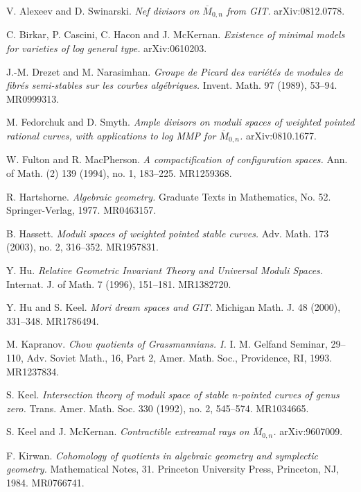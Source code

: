 \documentclass[10pt]{amsart}
\theoremstyle{definition}
\def\Mzn{\overline{M}_{0,n} }
\begin{document}


\begin{thebibliography}{10}

 V. Alexeev and D. Swinarski. {\em Nef divisors on
$\overline{M}_{0,n}$ from GIT.} arXiv:0812.0778.

 C. Birkar, P. Cascini, C. Hacon and J. McKernan.
{\em Existence of minimal models for varieties of log general type.}
arXiv:0610203.

J.-M. Drezet and M. Narasimhan. {\em Groupe de Picard des
vari\'et\'es de modules de fibr\'es semi-stables sur les courbes
alg\'ebriques.} Invent. Math. 97 (1989), 53--94. MR0999313.

 M. Fedorchuk and D. Smyth. {\em Ample divisors
on moduli spaces of weighted pointed rational curves, with
applications to log MMP for $\overline{M}_{0,n}$.}
arXiv:0810.1677.

 W. Fulton and R. MacPherson. {\em A compactification
of configuration spaces.} Ann. of Math. (2)  139  (1994),  no. 1, 183--225.
MR1259368.

 R. Hartshorne. {\em Algebraic geometry.}
Graduate Texts in Mathematics, No. 52. Springer-Verlag, 1977. MR0463157.

 B. Hassett. {\em Moduli spaces of weighted pointed stable curves.}
Adv. Math.  173  (2003),  no. 2, 316--352. MR1957831.

 Y. Hu. {\em Relative Geometric Invariant Theory and Universal Moduli Spaces.}
Internat. J. of Math. 7 (1996), 151--181. MR1382720.

 Y. Hu and S. Keel. {\em Mori dream spaces and GIT.}
Michigan Math. J.  48  (2000), 331--348. MR1786494.

 M. Kapranov. {\em Chow quotients of Grassmannians. I.}
I. M. Gelfand Seminar,  29--110, Adv. Soviet Math., 16, Part 2, Amer. Math. Soc., Providence, RI, 1993.
MR1237834.

 S. Keel. {\em Intersection theory of moduli space
of stable n-pointed curves of genus zero.} Trans. Amer. Math. Soc.
330 (1992), no. 2, 545--574. MR1034665.

 S. Keel and J. McKernan. {\em Contractible extreamal rays
on $\Mzn$.} arXiv:9607009.

 F. Kirwan. {\em Cohomology of quotients in algebraic
geometry and symplectic geometry.}
Mathematical Notes, 31. Princeton University Press, Princeton, NJ, 1984.
MR0766741.


\end{thebibliography}
\end{document}
